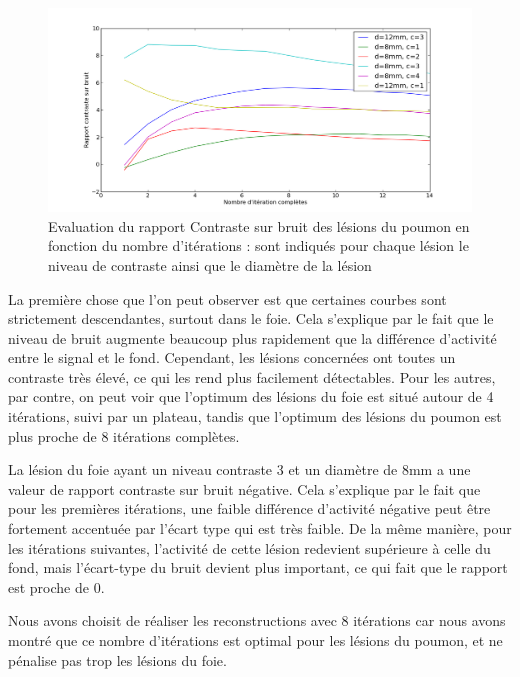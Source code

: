 \begin{figure}
\centering
\includegraphics[width=17cm]{images/CNRPoumon}
\caption[Evaluation du rapport Contraste sur bruit des lésions du poumon en fonction du nombre d'itérations]{Evaluation du rapport Contraste sur bruit des lésions du poumon en fonction du nombre d'itérations : sont indiqués pour chaque lésion le niveau de contraste ainsi que le diamètre de la lésion}
\label{fig:CNRPoumon}
\end{figure}

La première chose que l'on peut observer est que certaines courbes sont strictement descendantes, surtout dans le foie. Cela s'explique par le fait que le niveau de bruit augmente beaucoup plus rapidement que la différence d'activité entre le signal et le fond. Cependant, les lésions concernées ont toutes un contraste très élevé, ce qui les rend plus facilement détectables. Pour les autres, par contre, on peut voir que l'optimum des lésions du foie est situé autour de 4 itérations, suivi par un plateau, tandis que l'optimum des lésions du poumon est plus proche de 8 itérations complètes.

La lésion du foie ayant un niveau contraste 3 et un diamètre de 8mm a une valeur de rapport contraste sur bruit négative. Cela s'explique par le fait que pour les premières itérations, une faible différence d'activité négative peut être fortement accentuée par l'écart type qui est très faible. De la même manière, pour les itérations suivantes, l'activité de cette lésion redevient supérieure à celle du fond, mais l'écart-type du bruit devient plus important, ce qui fait que le rapport est proche de 0.

Nous avons choisit de réaliser les reconstructions avec 8 itérations car nous avons montré que ce nombre d'itérations est optimal pour les lésions du poumon, et ne pénalise pas trop les lésions du foie.



